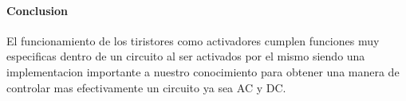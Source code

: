 \documentclass[12pt,a4paper]{report}
\begin{document}
\paragraph{Conclusion}
El funcionamiento de los tiristores como activadores cumplen funciones muy especificas dentro de un circuito al ser activados por el mismo siendo una implementacion importante a nuestro conocimiento para obtener una manera de controlar mas efectivamente un circuito ya sea AC y DC.
\end{document}
